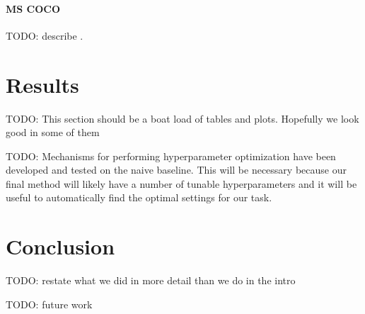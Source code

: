 \documentclass[twocolumn]{article}
\newcommand{\todo}[1]{}
\renewcommand{\todo}[1]{{\color{red} TODO: {#1}}}
\newcommand{\seclab}[1]{\label{sec:#1}}
\begin{document}
\paragraph{MS COCO} \todo{describe} \cite{lin2014microsoft}.

\section{Results}\seclab{results}

\todo{This section should be a boat load of tables and plots. Hopefully we look good in some of them}

\todo{
Mechanisms for performing hyperparameter optimization have been developed and tested on the naive baseline. This will be
necessary because our final method will likely have a number of tunable hyperparameters and it will be useful to automatically
find the optimal settings for our task.
}

\section{Conclusion}

\todo{restate what we did in more detail than we do in the intro}

\todo{future work}


 
\end{document}

